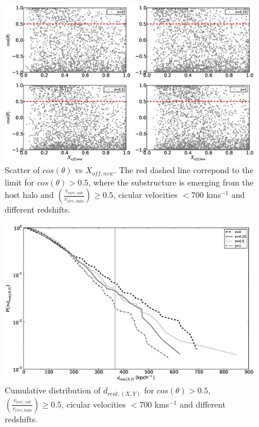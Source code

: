 \documentclass{emulateapj}
\begin{document}
\begin{figure}
\begin{center}
\includegraphics[width=1.0\textwidth]{Figures_eps/figure_8_1_nu=0.5_300kms_700kms.eps}
\end{center}
\caption{Scatter of $cos(\theta)$ vs $X_{off,new}$. The red dashed line correpond to the limit for $cos(\theta{})>0.5$,  
where the substructure is emerging from the host halo and  $\left(\frac{v_{circ,sub}}{v_{circ,halo}}\right)\geq0.5$, 
cicular velocities $<700$ kms$^{-1}$ and different redshifts.} 
\label{cos_theta}
\end{figure}

\begin{figure}
\begin{center}
\includegraphics[width=1.0\textwidth]{Figures_eps/figure_8_3_nu=0.5_300kms_700kms.eps}
\end{center}
\caption{Cumulative distribution of $d_{real, (X,Y)}$ for $cos(\theta)>0.5$, $\left(\frac{v_{circ,sub}}{v_{circ,halo}}\right)\geq0.5$, 
cicular velocities $<700$ kms$^{-1}$ and different redshifts.} 
\label{cumulative_cos}
\end{figure}
\end{document}
